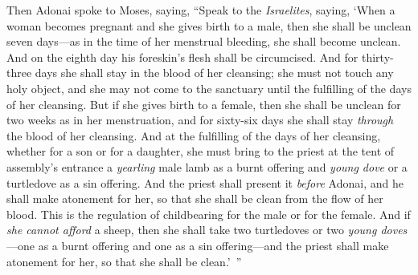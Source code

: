 \begin{biblechapter} %
 Then Adonai spoke to Moses, saying,
\verse “Speak to the \textit{Israelites}, saying, ‘When a woman becomes pregnant and she gives birth to a male, then she shall be unclean seven days—as in the time of her menstrual bleeding, she shall become unclean.
\verse And on the eighth day his foreskin’s flesh shall be circumcised.
\verse And for thirty-three days she shall stay in the blood of her cleansing; she must not touch any holy object, and she may not come to the sanctuary until the fulfilling of the days of her cleansing.
\verse But if she gives birth to a female, then she shall be unclean for two weeks as in her menstruation, and for sixty-six days she shall stay \textit{through} the blood of her cleansing.
\verse And at the fulfilling of the days of her cleansing, whether for a son or for a daughter, she must bring to the priest at the tent of assembly’s entrance a \textit{yearling} male lamb as a burnt offering and \textit{young dove} or a turtledove as a sin offering.
\verse And the priest shall present it \textit{before} Adonai, and he shall make atonement for her, so that she shall be clean from the flow of her blood. This is the regulation of childbearing for the male or for the female.
\verse And if \textit{she cannot afford} a sheep, then she shall take two turtledoves or two \textit{young doves}—one as a burnt offering and one as a sin offering—and the priest shall make atonement for her, so that she shall be clean.’ ”
\end{biblechapter}

